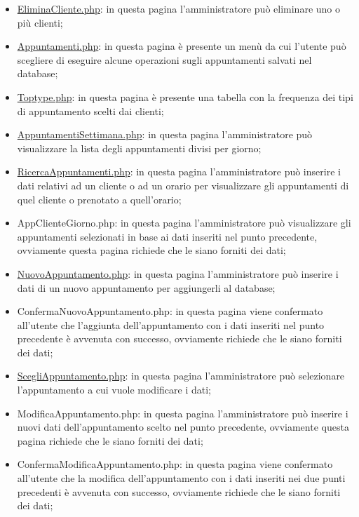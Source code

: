 {\begin{itemize}
		\item \href{http://tecweb2016.studenti.math.unipd.it/smarches/EliminaCliente.php}{EliminaCliente.php}: in questa pagina l'amministratore può eliminare uno o più clienti;
		\item \href{http://tecweb2016.studenti.math.unipd.it/smarches/Appuntamenti.php}{Appuntamenti.php}: in questa pagina è presente un menù da cui l'utente può scegliere di eseguire alcune operazioni sugli appuntamenti salvati nel database;
		\item \href{http://tecweb2016.studenti.math.unipd.it/smarches/Toptype.php}{Toptype.php}: in questa pagina è presente una tabella con la frequenza dei tipi di appuntamento scelti dai clienti;
		\item \href{http://tecweb2016.studenti.math.unipd.it/smarches/AppuntamentiSettimana.php}{AppuntamentiSettimana.php}: in questa pagina l'amministratore può visualizzare la lista degli appuntamenti divisi per giorno;
		\item \href{http://tecweb2016.studenti.math.unipd.it/smarches/RicercaAppuntamenti.php}{RicercaAppuntamenti.php}: in questa pagina l'amministratore può inserire i dati relativi ad un cliente o ad un orario per visualizzare gli appuntamenti di quel cliente o prenotato a quell'orario;
		\item AppClienteGiorno.php: in questa pagina l'amministratore può visualizzare gli appuntamenti selezionati in base ai dati inseriti nel punto precedente, ovviamente questa pagina richiede che le siano forniti dei dati;
		\item \href{http://tecweb2016.studenti.math.unipd.it/smarches/NuovoAppuntamento.php}{NuovoAppuntamento.php}: in questa pagina l'amministratore può inserire i dati di un nuovo appuntamento per aggiungerli al database;
		\item ConfermaNuovoAppuntamento.php: in questa pagina viene confermato all'utente che l'aggiunta dell'appuntamento con i dati inseriti nel punto precedente è avvenuta con successo, ovviamente richiede che le siano forniti dei dati;
		\item \href{http://tecweb2016.studenti.math.unipd.it/smarches/ScegliAppuntamento.php}{ScegliAppuntamento.php}: in questa pagina l'amministratore può selezionare l'appuntamento a cui vuole modificare i dati;
		\item ModificaAppuntamento.php: in questa pagina l'amministratore può inserire i nuovi dati dell'appuntamento scelto nel punto precedente, ovviamente questa pagina richiede che le siano forniti dei dati;
		\item ConfermaModificaAppuntamento.php: in questa pagina viene confermato all'utente che la modifica dell'appuntamento con i dati inseriti nei due punti precedenti è avvenuta con successo, ovviamente richiede che le siano forniti dei dati;

\end{itemize}}
